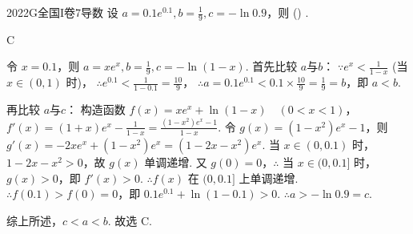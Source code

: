 
\begin{problem}{2022}{G}{全国I卷}{7}{导数}
设 $a=0.1e^{0.1}, b=\frac{1}{9}, c=-\ln 0.9$，则 (\hspace{1cm}) .
\begin{choices}
\end{choices}
\end{problem}

\begin{answer}
C
\end{answer}

\begin{solutions}
令 $x=0.1$，则 $a=xe^x, b=\frac{1}{9}, c=-\ln(1-x)$.
首先比较 $a$与$b$：
$\because e^x < \frac{1}{1-x}$ (当 $x \in (0,1)$ 时)，
$\therefore e^{0.1} < \frac{1}{1-0.1} = \frac{10}{9}$，
$\therefore a = 0.1e^{0.1} < 0.1 \times \frac{10}{9} = \frac{1}{9} = b$，即 $a < b$.

再比较 $a$与$c$：
构造函数 $f(x) = xe^x + \ln(1-x) \quad (0 < x < 1)$，
$f'(x) = (1+x)e^x - \frac{1}{1-x} = \frac{(1-x^2)e^x - 1}{1-x}$.
令 $g(x) = (1-x^2)e^x - 1$，则 $g'(x) = -2xe^x + (1-x^2)e^x = (1-2x-x^2)e^x$.
当 $x \in (0, 0.1)$ 时，$1-2x-x^2 > 0$，故 $g(x)$ 单调递增.
又 $g(0) = 0$，$\therefore$ 当 $x \in (0, 0.1]$ 时，$g(x) > 0$，即 $f'(x) > 0$.
$\therefore f(x)$ 在 $(0, 0.1]$ 上单调递增.
$\therefore f(0.1) > f(0) = 0$，即 $0.1e^{0.1} + \ln(1-0.1) > 0$.
$\therefore a > -\ln 0.9 = c$.

综上所述，$c < a < b$.
故选 C.
\end{solutions}